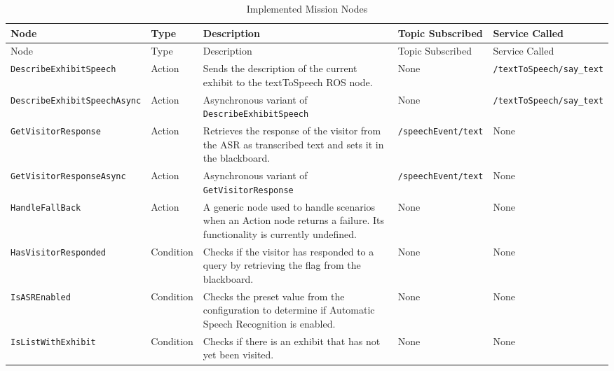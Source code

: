 \documentclass{CSSRforAfrica}
\begin{document}
\begin{landscape}
{\footnotesize
\begin{longtable}[c]{|p{4.8cm}|p{1.4cm}|p{4cm}|p{3.8cm}|p{6.6cm}|}
    \caption{Implemented Mission Nodes} \label{tab:implemented_mission_nodes}\\
    \hline
    \rowcolor{gray!30}
    \textnormal{Node} & \textnormal{Type} & \textnormal{Description} & \textnormal{Topic Subscribed} & \textnormal{Service Called} \\ \hline
    \endfirsthead
    \hline
    \rowcolor{gray!30}
    \textnormal{Node} & \textnormal{Type} & \textnormal{Description} & \textnormal{Topic Subscribed} & \textnormal{Service Called} \\ \hline
    \endhead
    \texttt{\footnotesize DescribeExhibitSpeech} & Action & Sends the description of the current exhibit to the textToSpeech ROS node. & None & \texttt{\footnotesize /textToSpeech/say\_text} \\ \hline
    \texttt{\footnotesize DescribeExhibitSpeechAsync} & Action & Asynchronous variant of \texttt{\footnotesize DescribeExhibitSpeech} & None & \texttt{\footnotesize /textToSpeech/say\_text} \\ \hline
    \texttt{\footnotesize GetVisitorResponse} & Action & Retrieves the response of the visitor from the ASR as transcribed text and sets it in the blackboard. & \texttt{\footnotesize /speechEvent/text} & None \\ \hline
    \texttt{\footnotesize GetVisitorResponseAsync} & Action & Asynchronous variant of \texttt{\footnotesize GetVisitorResponse} & \texttt{\footnotesize /speechEvent/text} & None \\ \hline
    \texttt{\footnotesize HandleFallBack} & Action & A generic node used to handle scenarios when an Action node returns a failure. Its functionality is currently undefined. & None & None \\ \hline
    \texttt{\footnotesize HasVisitorResponded} & Condition & Checks if the visitor has responded to a query by retrieving the flag from the blackboard. & None & None \\ \hline
    \texttt{\footnotesize IsASREnabled} & Condition & Checks the preset value from the configuration to determine if Automatic Speech Recognition is enabled. & None & None \\ \hline
    \texttt{\footnotesize IsListWithExhibit} & Condition & Checks if there is an exhibit that has not yet been visited. & None & None \\ \hline

\end{longtable}}
\end{landscape}
\end{document}
